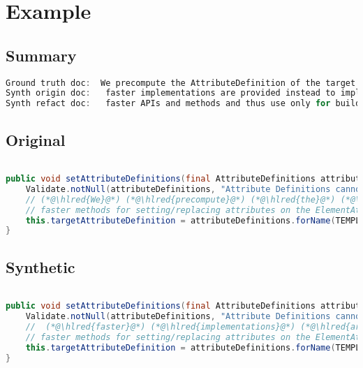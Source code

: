 \documentclass[11pt]{article}
\DeclareRobustCommand{\hlred}[1]{{\sethlcolor{YellowOrange}\hl{#1}}}
\begin{document}
  \pagebreak
  \section{Example}
  \subsection{Summary}

  \begin{lstlisting}[language=java]
Ground truth doc:  We precompute the AttributeDefinition of the target attribute in order to being able to use much
Synth origin doc:   faster implementations are provided instead to implement additional and more sophisticated or intuitive or useful but
Synth refact doc:   faster APIs and methods and thus use only for building elements but rather for using with
  \end{lstlisting}

  \subsection{Original}
  \begin{lstlisting}[language=java]

public void setAttributeDefinitions(final AttributeDefinitions attributeDefinitions) {
    Validate.notNull(attributeDefinitions, "Attribute Definitions cannot be null");
    // (*@\hlred{We}@*) (*@\hlred{precompute}@*) (*@\hlred{the}@*) (*@\hlred{AttributeDefinition}@*) (*@\hlred{of}@*) (*@\hlred{the}@*) (*@\hlred{target}@*) (*@\hlred{attribute}@*) (*@\hlred{in}@*) (*@\hlred{order}@*) (*@\hlred{to}@*) (*@\hlred{being}@*) (*@\hlred{able}@*) (*@\hlred{to}@*) (*@\hlred{use}@*) (*@\hlred{much}@*)
    // faster methods for setting/replacing attributes on the ElementAttributes implementation
    this.targetAttributeDefinition = attributeDefinitions.forName(TEMPLATE_MODE, TARGET_ATTR_NAME);
}
  \end{lstlisting}
  \subsection{Synthetic}

  \begin{lstlisting}[language=java]

public void setAttributeDefinitions(final AttributeDefinitions attributeDefinitions) {
    Validate.notNull(attributeDefinitions, "Attribute Definitions cannot be null");
    //  (*@\hlred{faster}@*) (*@\hlred{implementations}@*) (*@\hlred{are}@*) (*@\hlred{provided}@*) (*@\hlred{instead}@*) (*@\hlred{to}@*) (*@\hlred{implement}@*) (*@\hlred{additional}@*) (*@\hlred{and}@*) (*@\hlred{more}@*) (*@\hlred{sophisticated}@*) (*@\hlred{or}@*) (*@\hlred{intuitive}@*) (*@\hlred{or}@*) (*@\hlred{useful}@*) (*@\hlred{but}@*)
    // faster methods for setting/replacing attributes on the ElementAttributes implementation
    this.targetAttributeDefinition = attributeDefinitions.forName(TEMPLATE_MODE, TARGET_ATTR_NAME);
}
  \end{lstlisting}
\end{document}
